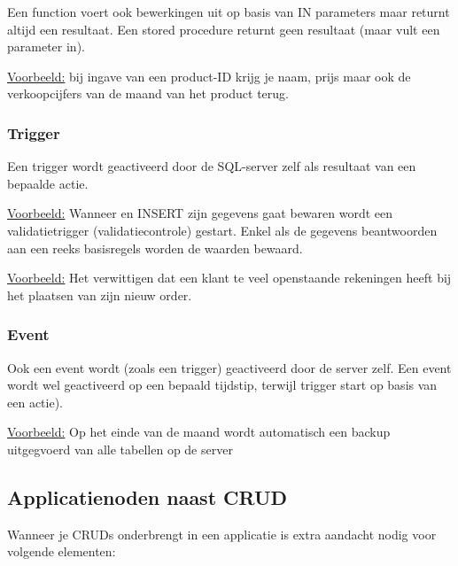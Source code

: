 \documentclass{article}
\begin{document}
Een function voert ook bewerkingen uit op basis van IN parameters maar returnt altijd een
resultaat. Een stored procedure returnt geen resultaat (maar vult een parameter in).

\underline{Voorbeeld:} bij ingave van een product-ID krijg je naam, prijs maar ook de verkoopcijfers van de
maand van het product terug.

\subsubsection{Trigger}

Een trigger wordt geactiveerd door de SQL-server zelf als resultaat van een bepaalde actie.


\underline{Voorbeeld:} Wanneer en INSERT zijn gegevens gaat bewaren wordt een validatietrigger
(validatiecontrole) gestart. Enkel als de gegevens beantwoorden aan een reeks basisregels worden
de waarden bewaard. 

\underline{Voorbeeld:} Het verwittigen dat een klant te veel openstaande rekeningen heeft bij het plaatsen 
van zijn nieuw order.

\subsubsection{Event}

Ook een event wordt (zoals een trigger) geactiveerd door de server zelf. Een event wordt wel
geactiveerd op een bepaald tijdstip, terwijl trigger start op basis van een actie).

\underline{Voorbeeld:} Op het einde van de maand wordt automatisch een backup uitgegvoerd van alle
tabellen op de server

\subsection{Applicatienoden naast CRUD}
Wanneer je CRUDs onderbrengt in een applicatie is extra aandacht nodig voor volgende elementen:
\end{document}

